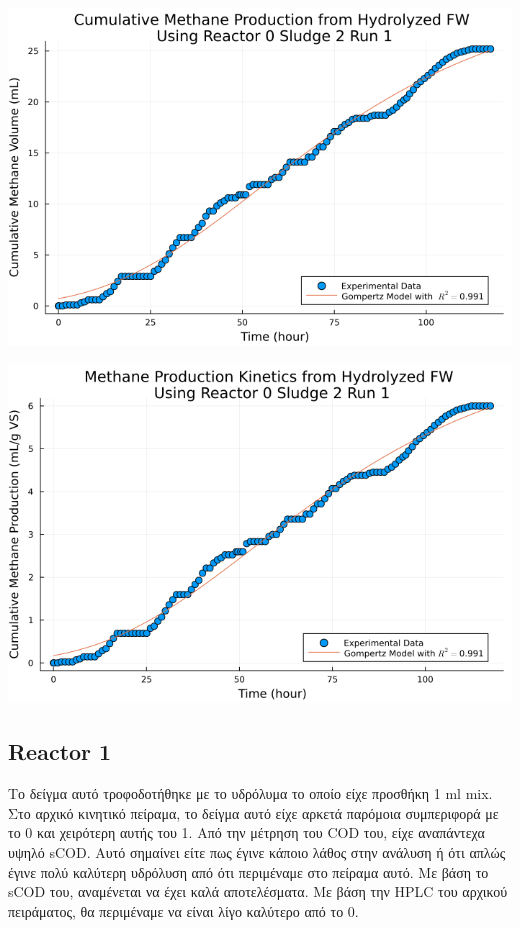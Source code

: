 \documentclass[11pt]{article}
\begin{document}
\begin{center}
\includegraphics[width=.9\linewidth]{../plots/BMPs/Hydrolyzed FW/methane_kinetics_hydrolysate_0_s2_r1_hour.png}
\end{center}

\begin{center}
\includegraphics[width=.9\linewidth]{../plots/BMPs/Hydrolyzed FW/specific_methane_kinetics_hydrolysate_0_s2_r1_hour.png}
\end{center}

\subsection{Reactor 1}
\label{sec:orgd1cc8b1}
Το δείγμα αυτό τροφοδοτήθηκε με το υδρόλυμα το οποίο είχε προσθήκη 1 ml mix. Στο αρχικό κινητικό πείραμα, το δείγμα αυτό είχε αρκετά παρόμοια συμπεριφορά με το 0 και χειρότερη αυτής του 1. Από την μέτρηση του COD του, είχε αναπάντεχα υψηλό sCOD. Αυτό σημαίνει είτε πως έγινε κάποιο λάθος στην ανάλυση ή ότι απλώς έγινε πολύ καλύτερη υδρόλυση από ότι περιμέναμε στο πείραμα αυτό. Με βάση το sCOD του, αναμένεται να έχει καλά αποτελέσματα. Με βάση την HPLC του αρχικού πειράματος, θα περιμέναμε να είναι λίγο καλύτερο από το 0.
\end{document}
